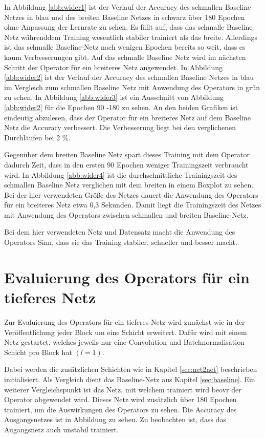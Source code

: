 In Abbildung \ref{abb:wider1} ist der Verlauf der Accuracy des schmallen Baseline Netzes in blau und des breiten Baseline Netzes in schwarz über 180 Epochen ohne Anpassung der Lernrate zu sehen. Es fällt auf, dass das schmalle Baseline Netz währenddem Training wesentlich stabiler trainiert als das breite. Allerdings ist das schmalle Baseline-Netz nach wenigen Epochen bereits so weit, dass es kaum Verbesserungen gibt. Auf das schmalle Baseline Netz wird im nächsten Schritt der Operator für ein breiteres Netz angewendet. In Abbildung \ref{abb:wider2} ist der Verlauf der Accuracy des schmallen Baseline Netzes in blau im Vergleich zum schmallen Baseline Netz mit Anwendung des Operators in grün zu sehen. In Abbildung \ref{abb:wider3} ist ein Ausschnitt von Abbildung \ref{abb:wider2} für die Epochen 90 -180 zu sehen. An den beiden Grafiken ist eindeutig abzulesen, dass der Operator für ein breiteres Netz auf dem Baseline Netz die Accuracy verbessert. Die Verbesserung liegt bei den verglichenen Durchläufen bei 2 \%. 

Gegenüber dem breiten Baseline Netz spart dieses Training mit dem Operator dadurch Zeit, dass in den ersten 90 Epochen weniger Trainingszeit verbraucht wird. In Abbildung \ref{abb:wider4} ist die durchschnittliche Trainingszeit des schmallen Baseline Netz verglichen mit dem breiten in einem Boxplot zu sehen. Bei der hier verwendeten Größe des Netzes dauert die Anwendung des Operators für ein breiteres Netz etwa 0,3 Sekunden. Damit liegt die Trainingszeit des Netzes mit Anwendung des Operators zwischen schmallen und breiten Baseline-Netz.


Bei dem hier verwendeten Netz und Datensatz macht die Anwendung des Operators Sinn, dass sie das Training stabiler, schneller und besser macht.





\section{Evaluierung des Operators für ein tieferes Netz}
Zur Evaluierung des Operators für ein tieferes Netz wird zunächst wie in der Veröffentlichung jeder Block um eine Schicht erweitert. Dafür wird mit einem Netz gestartet, welches jeweils nur eine Convolution und Batchnormalisation Schicht pro Block hat $ (l=1)$. 

Dabei werden die zusätzlichen Schichten wie in Kapitel \ref{sec:net2net} beschrieben initialisiert. Als Vergleich dient das Baseline-Netz aus Kapitel \ref{sec:baseline}. Ein weiterer Vergleichspunkt ist das Netz, mit welchem trainiert wird beovr der Operator abgewendet wird. Dieses Netz wird zusätzlich über 180 Epochen trainiert, um die Auswirkungen des Operators zu sehen. Die Accuracy des Ausgangsnetzes ist in Abbildung  zu sehen. Zu beobachten ist, dass das Augangsnetz auch unstabil trainiert. 



